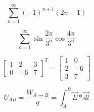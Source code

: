 \documentclass[a4paper]{article}
\begin{document}
$$ \sum_{n=1}^{\infty} (-1)^{n+1} (2n - 1) $$

$$ \sum_{n=1}^{\infty} \sin{\frac{2 \pi}{3^{n}}} \cos{\frac{4 \pi}{3^{n}}} $$

$$ \left[ 
\begin{array}{ccc}
1 & 2 & 3 \\
0 & -6 & 7 
\end{array}
\right]^{T}
=
\left[
\begin{array}{cc} 
1 & 0 \\
2 & -6 \\
3 & 7
\end{array}
\right]
$$

$$ U_{AB} = \frac{W_{A \to B}}{q} = \int_{A}^{B} \vec{E} * \vec{dl}  $$
\end{document}
